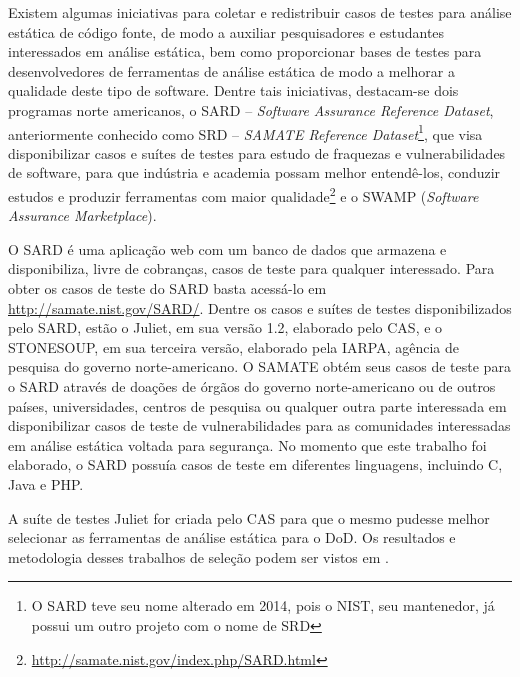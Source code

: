   Existem algumas iniciativas para coletar e redistribuir casos de testes para análise estática de código fonte, de modo a auxiliar pesquisadores e estudantes interessados em análise estática, bem como proporcionar bases de testes para desenvolvedores de ferramentas de análise estática de modo a melhorar a qualidade deste tipo de software. Dentre tais iniciativas, destacam-se dois programas norte americanos, o SARD  – \textit{Software Assurance Reference Dataset}, anteriormente conhecido como SRD – \textit{SAMATE Reference Dataset}\footnote{O SARD teve seu nome alterado em 2014, pois o NIST, seu mantenedor, já possui um outro projeto com o nome de SRD}, que visa disponibilizar casos e suítes de testes para estudo de fraquezas e vulnerabilidades de software, para que indústria e academia possam melhor entendê-los, conduzir estudos e produzir ferramentas com maior qualidade\footnote{\url{http://samate.nist.gov/index.php/SARD.html}} e o SWAMP (\textit{Software Assurance Marketplace}).

  O SARD é uma aplicação web com um banco de dados que armazena e disponibiliza, livre de cobranças, casos de teste para qualquer interessado. Para obter os casos de teste do SARD basta acessá-lo em \url{http://samate.nist.gov/SARD/}. Dentre os casos e suítes de testes disponibilizados pelo SARD, estão o Juliet, em sua versão 1.2, elaborado pelo CAS, e o STONESOUP, em sua terceira versão, elaborado pela IARPA, agência de pesquisa do governo norte-americano. O SAMATE obtém seus casos de teste para o SARD através de doações de órgãos do governo norte-americano ou de outros países, universidades, centros de pesquisa ou qualquer outra parte interessada em disponibilizar casos de teste de vulnerabilidades para as comunidades interessadas em análise estática voltada para segurança. No momento que este trabalho foi elaborado, o SARD possuía casos de teste em diferentes linguagens, incluindo C, Java e PHP.

  A suíte de testes Juliet for criada pelo CAS para que o mesmo pudesse melhor selecionar as ferramentas de análise estática para o DoD. Os resultados e metodologia desses trabalhos de seleção podem ser vistos em \cite{nsa}.

